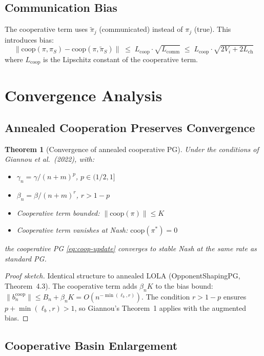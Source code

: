 \documentclass[11pt]{article}
\newtheorem{theorem}{Theorem}[section]
\begin{document}
\subsection{Communication Bias}

The cooperative term uses $\tilde{\pi}_j$ (communicated) instead of
$\pi_j$ (true). This introduces bias:
\begin{equation}
  \|\text{coop}(\pi, \pi_{S}) - \text{coop}(\pi, \tilde{\pi}_{S})\|
  \;\leq\; L_{\text{coop}} \cdot \sqrt{L_{\text{comm}}}
  \;\leq\; L_{\text{coop}} \cdot \sqrt{2V_i + 2L_{\text{ch}}}
\end{equation}
where $L_{\text{coop}}$ is the Lipschitz constant of the cooperative term.


\section{Convergence Analysis}

\subsection{Annealed Cooperation Preserves Convergence}

\begin{theorem}[Convergence of annealed cooperative PG]\label{thm:coop-conv}
Under the conditions of Giannou et al.\ (2022), with:
\begin{itemize}
  \item $\gamma_n = \gamma/(n+m)^p$, $p \in (1/2, 1]$
  \item $\beta_n = \beta/(n+m)^r$, $r > 1 - p$
  \item Cooperative term bounded: $\|\text{coop}(\pi)\| \leq K$
  \item Cooperative term vanishes at Nash: $\text{coop}(\pi^*) = 0$
\end{itemize}
the cooperative PG \eqref{eq:coop-update} converges to stable Nash
at the same rate as standard PG.
\end{theorem}

\begin{proof}[Proof sketch]
Identical structure to annealed LOLA (OpponentShapingPG, Theorem~4.3).
The cooperative term adds $\beta_n K$ to the bias bound:
$\|b_n^{\text{coop}}\| \leq B_n + \beta_n K = O(n^{-\min(\ell_b, r)})$.
The condition $r > 1 - p$ ensures $p + \min(\ell_b, r) > 1$,
so Giannou's Theorem~1 applies with the augmented bias.
\end{proof}

\subsection{Cooperative Basin Enlargement}
\end{document}
